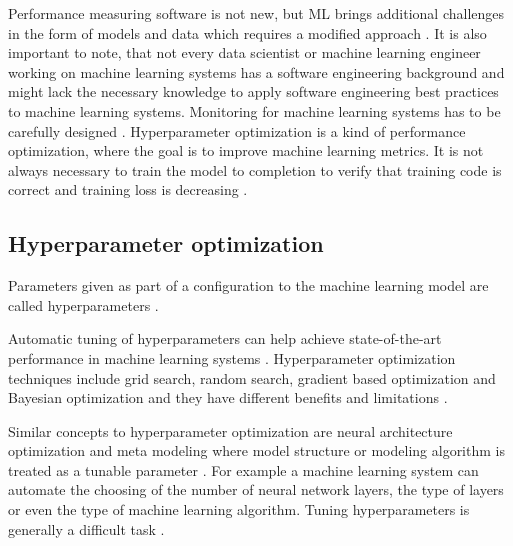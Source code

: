 Performance measuring software is not new, but ML brings additional challenges in the form of models and data which requires a modified approach \parencite{breckMLTestScore2017a}. It is also important to note, that not every data scientist or machine learning engineer working on machine learning systems has a software engineering background \parencite{finzerDataScienceEducation2013} and might lack the necessary knowledge to apply software engineering best practices to machine learning systems. Monitoring for machine learning systems has to be carefully designed \parencite{sculleyHiddenTechnicalDebt2015a}. Hyperparameter optimization is a kind of performance optimization, where the goal is to improve machine learning metrics. It is not always necessary to train the model to completion to verify that training code is correct and training loss is decreasing \parencite{breckMLTestScore2017a}.


\subsection{Hyperparameter optimization}


Parameters given as part of a configuration to the machine learning model are called hyperparameters \parencite{yangHyperparameterOptimizationMachine2020}. 


Automatic tuning of hyperparameters can help achieve state-of-the-art performance in machine learning systems \parencite{maclaurinGradientbasedHyperparameterOptimization2015}.
Hyperparameter optimization techniques include grid search, random search, gradient based optimization and Bayesian optimization and they have different benefits and limitations \parencite{yangHyperparameterOptimizationMachine2020}.

Similar concepts to hyperparameter optimization are neural architecture optimization and meta modeling where model structure or modeling algorithm is treated as a tunable parameter \parencite{bakerAcceleratingNeuralArchitecture2017}.
For example a machine learning system can automate the choosing of the number of neural network layers, the type of layers or even the type of machine learning algorithm.
Tuning hyperparameters is generally a difficult task \parencite{maclaurinGradientbasedHyperparameterOptimization2015}.

